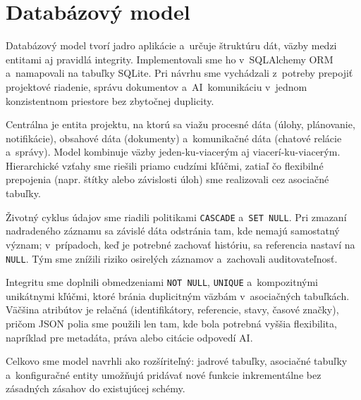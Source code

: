 \chapter{Databázový model}

        Databázový model tvorí jadro aplikácie a~určuje štruktúru dát, väzby medzi
entitami aj pravidlá integrity. Implementovali sme ho v~SQLAlchemy ORM a~namapovali
na tabuľky SQLite. Pri návrhu sme vychádzali z~potreby prepojiť projektové riadenie, správu
dokumentov a~AI~komunikáciu v~jednom konzistentnom priestore bez zbytočnej duplicity.

        Centrálna je entita projektu, na ktorú sa viažu procesné dáta (úlohy,
plánovanie, notifikácie), obsahové dáta (dokumenty) a~komunikačné dáta (chatové
relácie a~správy). Model kombinuje väzby jeden-ku-viacerým aj viacerí-ku-viacerým.
Hierarchické vzťahy sme riešili priamo cudzími kľúčmi, zatiaľ čo flexibilné prepojenia
(napr. štítky alebo závislosti úloh) sme realizovali cez asociačné tabuľky.

        Životný cyklus údajov sme riadili politikami \texttt{CASCADE} a~\texttt{SET NULL}.
Pri zmazaní nadradeného záznamu sa závislé dáta odstránia tam, kde nemajú samostatný
význam; v~prípadoch, keď je potrebné zachovať históriu, sa referencia nastaví na
\texttt{NULL}. Tým sme znížili riziko osirelých záznamov a~zachovali auditovateľnosť.

        Integritu sme doplnili obmedzeniami \texttt{NOT NULL}, \texttt{UNIQUE} a~kompozitnými
unikátnymi kľúčmi, ktoré bránia duplicitným väzbám v~asociačných tabuľkách. Väčšina
atribútov je relačná (identifikátory, referencie, stavy, časové značky), pričom JSON
polia sme použili len tam, kde bola potrebná vyššia flexibilita, napríklad pre metadáta,
práva alebo citácie odpovedí AI.

        Celkovo sme model navrhli ako rozšíriteľný: jadrové tabuľky, asociačné
tabuľky a~konfiguračné entity umožňujú pridávať nové funkcie inkrementálne bez
zásadných zásahov do existujúcej schémy.
